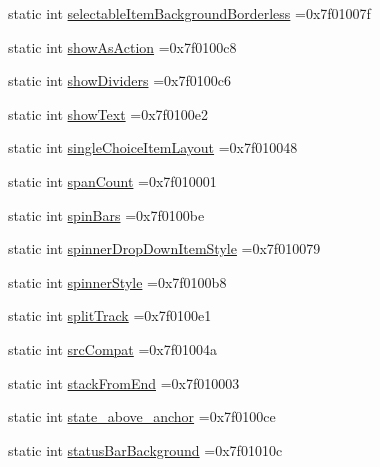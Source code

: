 \begin{DoxyCompactItemize}
\item 
static int \hyperlink{classandroid_1_1support_1_1design_1_1R_1_1attr_ab7ce9e711117ab9af03c5d753d9124dc}{selectable\+Item\+Background\+Borderless} =0x7f01007f
\item 
static int \hyperlink{classandroid_1_1support_1_1design_1_1R_1_1attr_a8e31fca542d0605aaee166fed8a798b6}{show\+As\+Action} =0x7f0100c8
\item 
static int \hyperlink{classandroid_1_1support_1_1design_1_1R_1_1attr_a1f12216785c0071388c469052f16e508}{show\+Dividers} =0x7f0100c6
\item 
static int \hyperlink{classandroid_1_1support_1_1design_1_1R_1_1attr_a597e6085eb2b6ab2b0bf020cd0e1fb17}{show\+Text} =0x7f0100e2
\item 
static int \hyperlink{classandroid_1_1support_1_1design_1_1R_1_1attr_a60f49df56d4291da99236ac0f3e4279c}{single\+Choice\+Item\+Layout} =0x7f010048
\item 
static int \hyperlink{classandroid_1_1support_1_1design_1_1R_1_1attr_a2b750d4992202f705352197b5671bc88}{span\+Count} =0x7f010001
\item 
static int \hyperlink{classandroid_1_1support_1_1design_1_1R_1_1attr_a8887867b280197a662e6b092f0ddcafe}{spin\+Bars} =0x7f0100be
\item 
static int \hyperlink{classandroid_1_1support_1_1design_1_1R_1_1attr_afbb73b15113fa7eb3cad3845486711fb}{spinner\+Drop\+Down\+Item\+Style} =0x7f010079
\item 
static int \hyperlink{classandroid_1_1support_1_1design_1_1R_1_1attr_a822fe744c71f5d8738ea30e75cf31f90}{spinner\+Style} =0x7f0100b8
\item 
static int \hyperlink{classandroid_1_1support_1_1design_1_1R_1_1attr_af1afe003beae279b9c25c54488687c06}{split\+Track} =0x7f0100e1
\item 
static int \hyperlink{classandroid_1_1support_1_1design_1_1R_1_1attr_aec1af09f1f86e1448a52a89a90842d29}{src\+Compat} =0x7f01004a
\item 
static int \hyperlink{classandroid_1_1support_1_1design_1_1R_1_1attr_a1f9238824c3f4302159c28ee264ad333}{stack\+From\+End} =0x7f010003
\item 
static int \hyperlink{classandroid_1_1support_1_1design_1_1R_1_1attr_a71358048ede13b57275c399f9dc04e71}{state\+\_\+above\+\_\+anchor} =0x7f0100ce
\item 
static int \hyperlink{classandroid_1_1support_1_1design_1_1R_1_1attr_a60b91d21d0adc859faed1dfaa213521a}{status\+Bar\+Background} =0x7f01010c
\item 

\end{DoxyCompactItemize}
